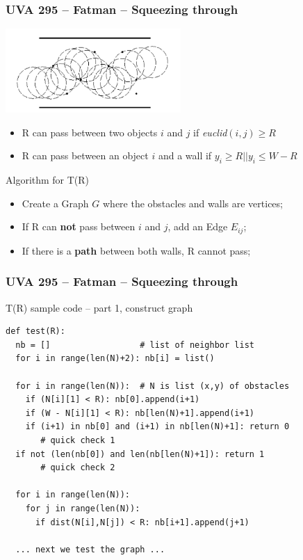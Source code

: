 \begin{frame}
  \frametitle{UVA 295 -- Fatman -- Squeezing through}

  {\smaller
    \begin{center}
      \includegraphics[width=0.5\textwidth]{img/fatman}
    \end{center}

    \begin{itemize}
    \item R can pass between two objects $i$ and $j$ if \emph{euclid}$(i,j) \geq R$
    \item R can pass between an object $i$ and a wall if $y_i \geq R || y_i \leq W-R$
    \end{itemize}

    \bigskip

    \begin{exampleblock}{Algorithm for T(R)}
      \begin{itemize}
      \item Create a Graph $G$ where the obstacles and walls are vertices;
      \item If R can {\bf not} pass between $i$ and $j$, add an Edge $E_{ij}$;
      \item If there is a {\bf path} between both walls, \alert{R cannot pass};
      \end{itemize}
    \end{exampleblock}
  }
\end{frame}

\begin{frame}[fragile]
  \frametitle{UVA 295 -- Fatman -- Squeezing through}

  {\smaller
  \begin{block}{T(R) sample code -- part 1, construct graph}
\begin{verbatim}
def test(R):
  nb = []                  # list of neighbor list
  for i in range(len(N)+2): nb[i] = list()

  for i in range(len(N)):  # N is list (x,y) of obstacles
    if (N[i][1] < R): nb[0].append(i+1)
    if (W - N[i][1] < R): nb[len(N)+1].append(i+1)
    if (i+1) in nb[0] and (i+1) in nb[len(N)+1]: return 0
       # quick check 1
  if not (len(nb[0]) and len(nb[len(N)+1]): return 1
       # quick check 2

  for i in range(len(N)):
    for j in range(len(N)):
      if dist(N[i],N[j]) < R: nb[i+1].append(j+1)

  ... next we test the graph ...
\end{verbatim}
  \end{block}
  }
\end{frame}


